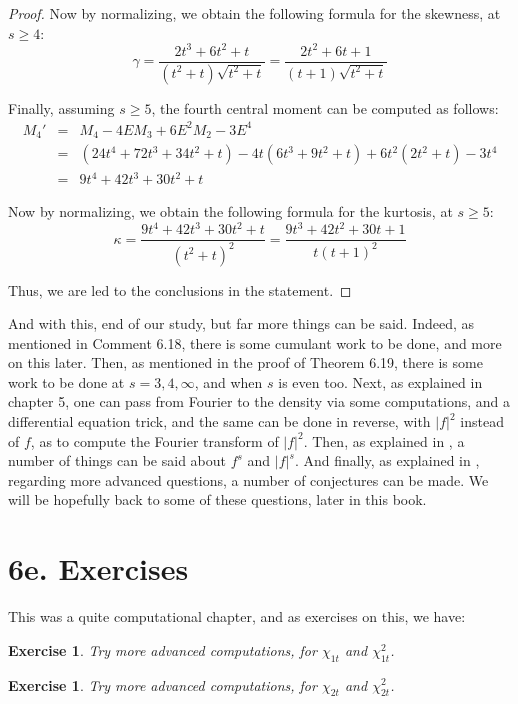 \documentclass[12pt]{amsbook}
\newtheorem{exercise}[theorem]{Exercise}
\begin{document}
\begin{proof}
Now by normalizing, we obtain the following formula for the skewness, at $s\geq4$:
$$\gamma=\frac{2t^3+6t^2+t}{(t^2+t)\sqrt{t^2+t}}
=\frac{2t^2+6t+1}{(t+1)\sqrt{t^2+t}}$$

Finally, assuming $s\geq5$, the fourth central moment can be computed as follows:
\begin{eqnarray*}
M_4'
&=&M_4-4EM_3+6E^2M_2-3E^4\\
&=&(24t^4+72t^3+34t^2+t)-4t(6t^3+9t^2+t)+6t^2(2t^2+t)-3t^4\\
&=&9t^4+42t^3+30t^2+t
\end{eqnarray*}

Now by normalizing, we obtain the following formula for the kurtosis, at $s\geq5$:
$$\kappa=\frac{9t^4+42t^3+30t^2+t}{(t^2+t)^2}
=\frac{9t^3+42t^2+30t+1}{t(t+1)^2}$$

Thus, we are led to the conclusions in the statement.
\end{proof}

And with this, end of our study, but far more things can be said. Indeed, as mentioned in Comment 6.18, there is some cumulant work to be done, and more on this later. Then, as mentioned in the proof of Theorem 6.19, there is some work to be done at $s=3,4,\infty$, and when $s$ is even too. Next, as explained in chapter 5, one can pass from Fourier to the density via some computations, and a differential equation trick, and the same can be done in reverse, with $|f|^2$ instead of $f$, as to compute the Fourier transform of $|f|^2$. Then, as explained in \cite{bb+}, a number of things can be said about $f^s$ and $|f|^s$. And finally, as explained in \cite{bcu}, regarding more advanced questions, a number of conjectures can be made. We will be hopefully back to some of these questions, later in this book.

\section*{6e. Exercises}

This was a quite computational chapter, and as exercises on this, we have:

\begin{exercise}
Try more advanced computations, for $\chi_{1t}$ and $\chi_{1t}^2$.
\end{exercise}

\begin{exercise}
Try more advanced computations, for $\chi_{2t}$ and $\chi_{2t}^2$.
\end{exercise}
\end{document}
